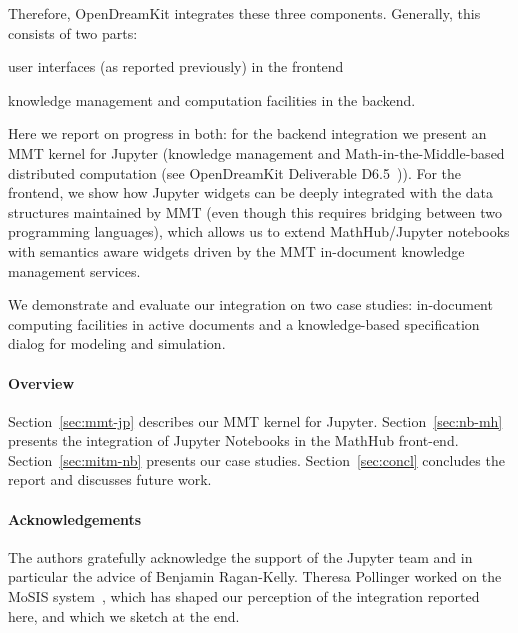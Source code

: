 Therefore, OpenDreamKit integrates these three components.
Generally, this consists of two parts:
\begin{inparaenum}[\em a\rm )]
\item user interfaces (as reported previously) in the frontend
\item knowledge management and computation facilities in the backend.
\end{inparaenum}
Here we report on progress in both: for the backend integration we present an MMT kernel for Jupyter (knowledge management and Math-in-the-Middle-based distributed computation (see OpenDreamKit Deliverable D6.5~\cite{ODK-D6.5})).
For the frontend, we show how Jupyter widgets can be deeply integrated with the data structures maintained by MMT (even though this requires bridging between two programming languages), which allows us to extend MathHub/Jupyter notebooks with semantics aware widgets driven by the MMT in-document knowledge management services.

We demonstrate and evaluate our integration on two case studies: in-document computing facilities in active documents and a knowledge-based specification dialog for modeling and simulation.

\paragraph{Overview}
Section~\ref{sec:mmt-jp} describes our MMT kernel for Jupyter.
Section~\ref{sec:nb-mh} presents the integration of Jupyter Notebooks in the MathHub front-end.
Section~\ref{sec:mitm-nb} presents our case studies.
Section~\ref{sec:concl} concludes the report and discusses future work.

\paragraph{Acknowledgements}
The authors gratefully acknowledge the support of the Jupyter team and in particular the advice of Benjamin Ragan-Kelly.
Theresa Pollinger worked on the MoSIS system~\cite{PolKohKoe:kacse18}, which has shaped our perception of the integration reported here, and which we sketch at the end. 

